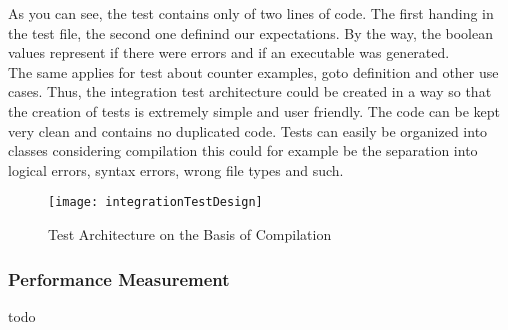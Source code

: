 As you can see, the test contains only of two lines of code. The first handing in the test file, the second one definind our expectations. By the way, the boolean values represent if there were errors and if an executable was generated.\\
The same applies for test about counter examples, goto definition and other use cases. Thus, the integration test architecture could be created in a way so that the creation of tests is extremely simple and user friendly. The code can be kept very clean and contains no duplicated code. Tests can easily be organized into classes \textendash{} considering compilation this could for example be the separation into logical errors, syntax errors, wrong file types and such.

\begin{figure}[H]
    \centering
    \texttt{[image: integrationTestDesign]}
    \caption{Test Architecture on the Basis of Compilation}
    \label{fig:testArchitecture}
\end{figure}

\subsubsection{Performance Measurement }
todo
